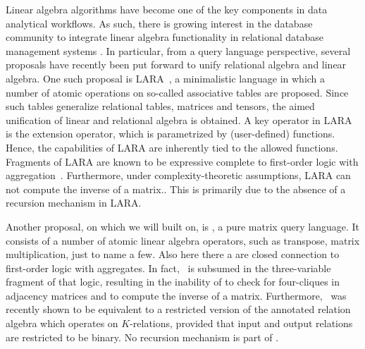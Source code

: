 
%
Linear algebra algorithms have become one of the key components in data analytical workflows. As such, there is growing interest in the database community to integrate linear algebra functionality in relational database management systems \cite{}. In particular, from a query language perspective, several proposals have recently been put forward to unify relational algebra and linear algebra. One such proposal is LARA~\cite{}, a minimalistic language in which a number of atomic operations on so-called associative tables are proposed. Since such tables generalize relational tables, matrices and tensors, the aimed unification of linear and relational algebra is obtained. A key operator in LARA is the extension operator, which is parametrized by (user-defined) functions. Hence, the capabilities of LARA are inherently tied to the allowed functions. Fragments of LARA are known to be expressive complete to first-order logic with aggregation~\cite{}. Furthermore, under complexity-theoretic assumptions, LARA can not compute the inverse of a matrix.\cite{}. This is primarily due to the absence of a recursion mechanism in LARA. 


Another proposal, on which we will built on, is \lang, a pure matrix query language. It consists of a number of atomic linear algebra operators, such as transpose, matrix multiplication, just to name a few. Also here there a are closed connection to first-order logic with aggregates. In fact, \lang\ is subsumed in the three-variable fragment of that logic, resulting in the inability of \lang to check for four-cliques in adjacency matrices and to compute the inverse of a matrix. Furthermore, \lang\ was recently shown to be equivalent to a restricted version of the annotated relation algebra which operates on $K$-relations, provided that input and output relations are restricted to be binary. No recursion mechanism is part of \lang.

